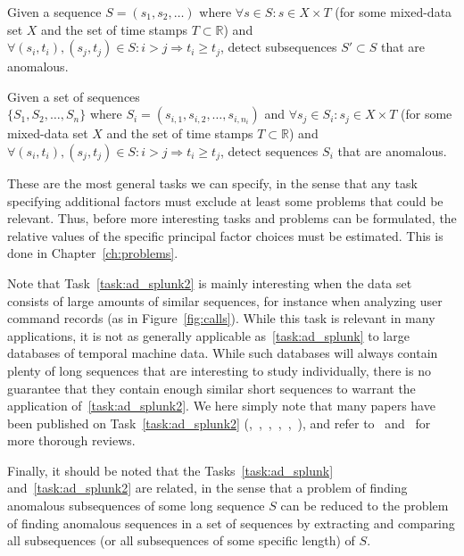 \begin{task}
\label{task:ad_splunk}
  Given a sequence $S = (s_1, s_2, \dots)$ where $\forall s \in S: s \in X \times T$ (for some mixed-data set $X$ and the set of time stamps $T \subset \mathbb{R}$) and $\forall (s_i, t_i), (s_j, t_j) \in S: i > j \Rightarrow t_i \geq t_j$, detect subsequences $S' \subset S$ that are anomalous.
\end{task}
\begin{task}
\label{task:ad_splunk2}
  Given a set of sequences\\ $\{S_1, S_2, \dots, S_n\}$ where $S_i = (s_{i,1}, s_{i,2}, \dots, s_{i, n_i})$ and $\forall s_j \in S_i: s_j \in X \times T$ (for some mixed-data set $X$ and the set of time stamps $T \subset \mathbb{R}$) and $\forall (s_i, t_i), (s_j, t_j) \in S: i > j \Rightarrow t_i \geq t_j$, detect sequences $S_i$ that are anomalous.
\end{task}

These are the most general tasks we can specify, in the sense that any task specifying additional factors must exclude at least some problems that could be relevant. Thus, before more interesting tasks and problems can be formulated, the relative values of the specific principal factor choices must be estimated. This is done in Chapter~\ref{ch:problems}.

Note that Task~\ref{task:ad_splunk2} is mainly interesting when the data set consists of large amounts of similar sequences, for instance when analyzing user command records (as in Figure~\ref{fig:calls}). While this task is relevant in many applications, it is not as generally applicable as~\ref{task:ad_splunk} to large databases of temporal machine data. While such databases will always contain plenty of long sequences that are interesting to study individually, there is no guarantee that they contain enough similar short sequences to warrant the application of~\ref{task:ad_splunk2}. We here simply note that many papers have been published on Task~\ref{task:ad_splunk2} (\cite{blender},~\cite{chan},~\cite{ye},~\cite{forrest},~\cite{sekar1},~\cite{sekar2}), and refer to~\cite{chandola2} and~\cite{chandola3} for more thorough reviews.

Finally, it should be noted that the Tasks~\ref{task:ad_splunk} and~\ref{task:ad_splunk2} are related, in the sense that a problem of finding anomalous subsequences of some long sequence $S$ can be reduced to the problem of finding anomalous sequences in a set of sequences by extracting and comparing all subsequences (or all subsequences of some specific length) of $S$.

